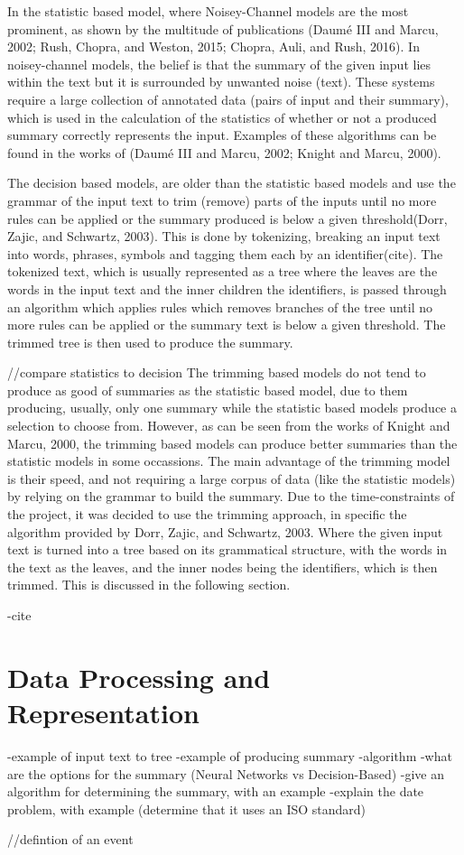 In the statistic based model, where Noisey-Channel models are the most prominent, as shown by the multitude of publications (Daum\'e III and Marcu, 2002; Rush, Chopra, and Weston, 2015; Chopra, Auli, and Rush, 2016). In noisey-channel models, the belief is that the summary of the given input lies within the text but it is surrounded by unwanted noise (text). These systems require a large collection of annotated data (pairs of input and their summary), which is used in the calculation of the statistics of whether or not a produced summary correctly represents the input. Examples of these algorithms can be found in the works of (Daum\'e III and Marcu, 2002; Knight and Marcu, 2000).\par
The decision based models, are older than the statistic based models and use the grammar of the input text to trim (remove) parts of the inputs until no more rules can be applied or the summary produced is below a given threshold(Dorr, Zajic, and Schwartz, 2003). This is done by tokenizing, breaking an input text into words, phrases, symbols and tagging them each by an identifier(cite). The tokenized text, which is usually represented as a tree where the leaves are the words in the input text and the inner children the identifiers, is passed through an algorithm which applies rules which removes branches of the tree until no more rules can be applied or the summary text is below a given threshold. The trimmed tree is then used to produce the summary.\par
//compare statistics to decision
The trimming based models do not tend to produce as good of summaries as the statistic based model, due to them producing, usually, only one summary while the statistic based models produce a selection to choose from. However, as can be seen from the works of Knight and Marcu, 2000, the trimming based models can produce better summaries than the statistic models in some occassions. The main advantage of the trimming model is their speed, and not requiring a large corpus of data (like the statistic models) by relying on the grammar to build the summary. Due to the time-constraints of the project, it was decided to use the trimming approach, in specific the algorithm provided by Dorr, Zajic, and Schwartz, 2003. Where the given input text is turned into a tree based on its grammatical structure, with the words in the text as the leaves, and the inner nodes being the identifiers, which is then trimmed. This is discussed in the following section.

-cite
\section{Data Processing and Representation}
-example of input text to tree
-example of producing summary
-algorithm
-what are the options for the summary (Neural Networks vs Decision-Based)
-give an algorithm for determining the summary, with an example
-explain the date problem, with example (determine that it uses an ISO standard)



//defintion of an event

